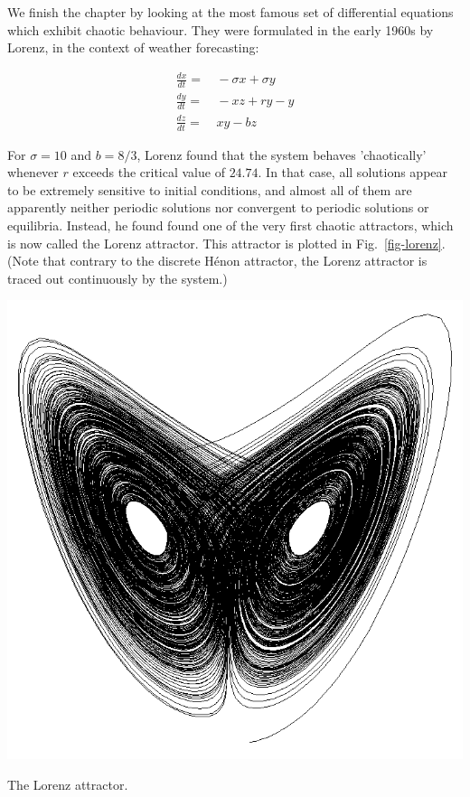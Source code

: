 We finish the chapter by looking at the most famous set of differential equations which exhibit chaotic behaviour. They were formulated in the early 1960s by Lorenz, in the context of weather forecasting:

\begin{align}
\frac{dx}{dt} =& \, -\sigma x + \sigma y \\
\frac{dy}{dt} =& \, -xz + r y - y \\
\frac{dz}{dt} =& \, xy - bz
\end{align} 

For $\sigma=10$ and $b=8/3$, Lorenz found that the system behaves 'chaotically' whenever $r$ exceeds the critical value of $24.74$. In that case, all solutions appear to be extremely sensitive to initial conditions, and almost all of them are apparently neither periodic solutions nor convergent to periodic solutions or equilibria. Instead, he found found one of the very first chaotic attractors, which is now called the Lorenz attractor. This attractor is plotted in Fig.~\ref{fig-lorenz}. (Note that contrary to the discrete H\'{e}non attractor, the Lorenz attractor is traced out continuously by the system.)

\begin{marginfigure}[-1cm]
\centering
\includegraphics{dynamic/figures/lorenz}
\caption{The Lorenz attractor.}
\label{fig-lorenz}
\end{marginfigure} 


